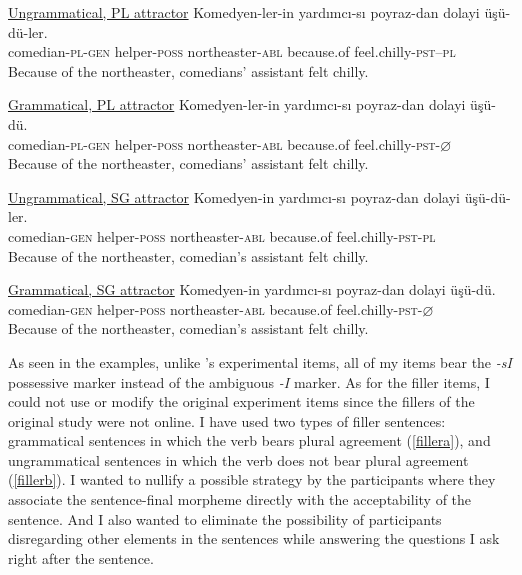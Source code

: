 \documentclass[doc]{apa6}
\begin{document}
\begin{exe}
\ex
  \begin{xlist}
  \ex \underline{Ungrammatical, PL attractor} \label{exp3}
      \gll Komedyen-ler-in yard{\i}mc{\i}-s{\i} poyraz-dan dolayi \"{u}\c{s}\"{u}-d\"{u}-ler.\\
  comedian-\textsc{pl}-\textsc{gen} helper-\textsc{poss} northeaster-\textsc{abl} because.of feel.chilly-\textsc{pst}--\textsc{pl}\\
      \glt Because of the northeaster, comedians' assistant felt chilly.

  \ex \underline{Grammatical, PL attractor} \label{exp2}
      \gll Komedyen-ler-in yard{\i}mc{\i}-s{\i} poyraz-dan dolayi \"{u}\c{s}\"{u}-d\"{u}.\\
  comedian-\textsc{pl}-\textsc{gen} helper-\textsc{poss} northeaster-\textsc{abl} because.of feel.chilly-\textsc{pst}-$\varnothing$\\
      \glt Because of the northeaster, comedians' assistant felt chilly.

  
  \ex \underline{Ungrammatical, SG attractor} \label{exp4}
      \gll Komedyen-in yard{\i}mc{\i}-s{\i} poyraz-dan dolayi \"{u}\c{s}\"{u}-d\"{u}-ler.\\
  comedian-\textsc{gen} helper-\textsc{poss} northeaster-\textsc{abl} because.of feel.chilly-\textsc{pst}-\textsc{pl}\\
      \glt Because of the northeaster, comedian's assistant felt chilly.
  
  \ex \underline{Grammatical, SG attractor} \label{exp1}
      \gll Komedyen-in yard{\i}mc{\i}-s{\i} poyraz-dan dolayi \"{u}\c{s}\"{u}-d\"{u}.\\
  comedian-\textsc{gen} helper-\textsc{poss} northeaster-\textsc{abl} because.of feel.chilly-\textsc{pst}-$\varnothing$\\
      \glt Because of the northeaster, comedian's assistant felt chilly.

  \end{xlist}
\end{exe}

As seen in the examples, unlike \textcite{Lago2018}'s experimental items, all of my items bear the \emph{-sI} possessive marker instead of the ambiguous \emph{-I} marker. As for the filler items, I could not use or modify the original experiment items since the fillers of the original study were not online. I have used two types of filler sentences: grammatical sentences in which the verb bears plural agreement (\autoref{fillera}), and ungrammatical sentences in which the verb does not bear plural agreement (\autoref{fillerb}). I wanted to nullify a possible strategy by the participants where they associate the sentence-final morpheme directly with the acceptability of the sentence. And I also wanted to eliminate the possibility of participants disregarding other elements in the sentences while answering the questions I ask right after the sentence.
\end{document}
